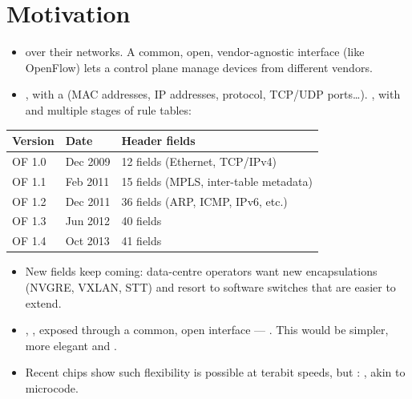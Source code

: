 \section{Motivation}
\begin{itemize}
\item {} over their networks.  A common, open, vendor-agnostic interface (like OpenFlow) lets a control plane manage devices from different vendors.
\item {}, with a  (MAC addresses, IP addresses, protocol, TCP/UDP ports\ldots). , with  and multiple stages of rule tables:
\end{itemize}
\begin{center}
\begin{tabular}{@{}lll@{}}
\toprule
\textbf{Version} & \textbf{Date} & \textbf{Header fields} \\
\midrule
OF 1.0 & Dec 2009 & 12 fields (Ethernet, TCP/IPv4) \\
OF 1.1 & Feb 2011 & 15 fields (MPLS, inter-table metadata) \\
OF 1.2 & Dec 2011 & 36 fields (ARP, ICMP, IPv6, etc.) \\
OF 1.3 & Jun 2012 & 40 fields \\
OF 1.4 & Oct 2013 & 41 fields \\
\bottomrule
\end{tabular}
\end{center}
\begin{itemize}
\item New fields keep coming: data-centre operators want new encapsulations (NVGRE, VXLAN, STT) and resort to software switches that are easier to extend.
\item {}, , exposed through a common, open interface --- . This would be simpler, more elegant and .
\item Recent chips show such flexibility is possible at terabit speeds, but : , akin to microcode.
\end{itemize}

